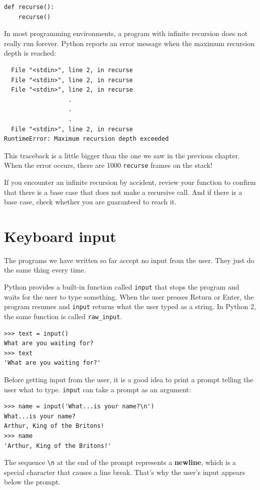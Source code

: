 \documentclass[10pt]{book}
\begin{document}
\begin{verbatim}
def recurse():
    recurse()
\end{verbatim}
%
In most programming environments, a program with infinite recursion
does not really run forever.  Python reports an error
message when the maximum recursion depth is reached:

\begin{verbatim}
  File "<stdin>", line 2, in recurse
  File "<stdin>", line 2, in recurse
  File "<stdin>", line 2, in recurse
                  .
                  .
                  .
  File "<stdin>", line 2, in recurse
RuntimeError: Maximum recursion depth exceeded
\end{verbatim}
%
This traceback is a little bigger than the one we saw in the
previous chapter.  When the error occurs, there are 1000
{\tt recurse} frames on the stack!

If you encounter an infinite recursion by accident, review
your function to confirm that there is a base case that does not
make a recursive call.  And if there is a base case, check whether
you are guaranteed to reach it.


\section{Keyboard input}

The programs we have written so far accept no input from the user.
They just do the same thing every time.

Python provides a built-in function called {\tt input} that
stops the program and
waits for the user to type something.  When the user presses {\sf
  Return} or {\sf Enter}, the program resumes and \verb"input"
returns what the user typed as a string.  In Python 2, the same
function is called \verb"raw_input".

\begin{verbatim}
>>> text = input()
What are you waiting for?
>>> text
'What are you waiting for?'
\end{verbatim}
%
Before getting input from the user, it is a good idea to print a
prompt telling the user what to type.  \verb"input" can take a
prompt as an argument:

\begin{verbatim}
>>> name = input('What...is your name?\n')
What...is your name?
Arthur, King of the Britons!
>>> name
'Arthur, King of the Britons!'
\end{verbatim}
%
The sequence \verb"\n" at the end of the prompt represents a {\bf
  newline}, which is a special character that causes a line break.
That's why the user's input appears below the prompt.  
\end{document}
